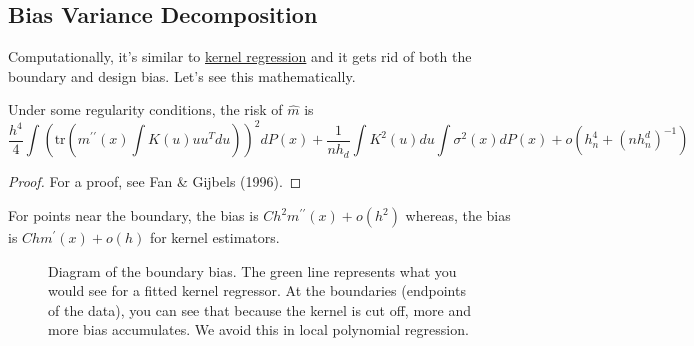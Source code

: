 \subsection{Bias Variance Decomposition}

  Computationally, it's similar to \hyperref[def:kernel-regression]{kernel regression} and it gets rid of both the boundary and design bias. Let's see this mathematically. 

  \begin{theorem}
    \label{thm:bias-variance-decomposition}
    Under some regularity conditions, the risk of $\hat{m}$ is
    \begin{equation}
      \frac{h^4}{4} \int \left( \text{tr}(m^{\prime\prime}(x) \int K(u)uu^T du) \right)^2 dP(x) + \frac{1}{nh_d} \int K^2(u)du \int \sigma^2(x)dP(x) + o(h_n^4 + (nh_n^d)^{-1})
    \end{equation}
  \end{theorem}
  \begin{proof}
    For a proof, see Fan \& Gijbels (1996). 
  \end{proof}

  For points near the boundary, the bias is $Ch^2m^{\prime\prime}(x) + o(h^2)$ whereas, the bias is $Chm^{\prime}(x) + o(h)$ for kernel estimators.

  \begin{figure}[H]
    \centering 
    \caption{Diagram of the boundary bias. The green line represents what you would see for a fitted kernel regressor. At the boundaries (endpoints of the data), you can see that because the kernel is cut off, more and more bias accumulates. We avoid this in local polynomial regression.} 
  \end{figure}

